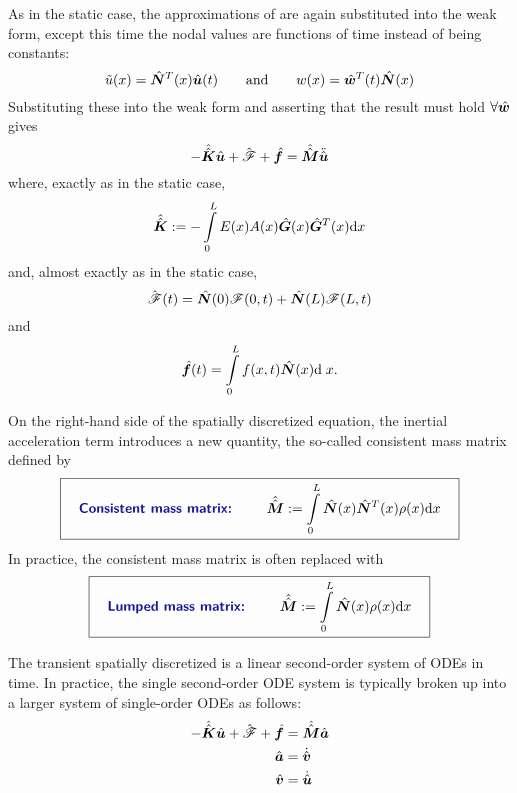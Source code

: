 As in the static case, the approximations of  are again substituted into the weak form, except this time the nodal values are functions of time instead of being constants:
\begin{equation}
  \tilde{u}(x)=
\hat{\bm{N}}^T(x) \hat{\bm{u}}(t)
\qquad\text{and}\qquad
  w(x)=\hat{\bm{w}}^T(t) \hat{\bm{N}}(x)
\label{eq:uandwtransient}
\end{equation}
Substituting these into the weak form and asserting that the result must hold $\forall \hat{\bm{w}}$ gives
\begin{equation}
-\hat{\hat{\bm{K}}}\hat{\bm{u}}+\hat{\bm{\mathscr{F}}}  +  \hat{\bm{f}}=\hat{\hat{\bm{M}}}\ddot{\hat{\bm{u}}}
\label{eq:TransientLinearBarWeakFormDiscr}
\end{equation}
%
%
where, exactly as in the static case,
\begin{equation}
  \hat{\hat{\bm{K}}} :=-\int\limits_0^L E(x)A(x) \hat{\bm{G}}(x)\hat{\bm{G}}^T(x)\mathrm{d} x
\end{equation}
and, almost exactly as in the static case,
\begin{equation}
  \hat{\bm{\mathscr{F}}}(t)=
\hat{\bm{N}}(0)\mathscr{F}(0,t)+\hat{\bm{N}}(L)\mathscr{F}(L,t)
\end{equation}
and
\begin{equation}
\hat{\bm{f}}(t)=
\int\limits_0^L f(x,{t})\hat{\bm{N}}(x)\mathrm{d} \;x.
\label{eq:TransientlinearBarBodyForceArray}
\end{equation}

On the right-hand side of the spatially discretized equation, the inertial acceleration term introduces a new quantity, the so-called consistent mass matrix defined by
\begin{equation}
\boxit{\quad
 \text{\Defn{Consistent mass matrix: }}\qquad \AArray{M}\definedEqual\int\limits_0^L \NBFa(x)\NBFa^T(x) \rho(x) \dd x
\quad}
\end{equation} 
In practice, the consistent mass matrix is often replaced with
\begin{equation}
\boxit{\quad
 \text{\Defn{Lumped mass matrix: }}\qquad \AArray{M}\definedEqual\int\limits_0^L \NBFa(x) \rho(x) \dd x
\quad}
\end{equation}


The transient spatially discretized  is a linear second-order system of ODEs in time. In practice, the single second-order ODE system is typically broken up into a larger system of single-order ODEs as follows:
\begin{subequations}
\begin{align}
-\hat{\hat{\bm{K}}}\hat{\bm{u}}+\hat{\bm{\mathscr{F}}}  +  \hat{\bm{f}}&=\hat{\hat{\bm{M}}}\hat{\bm{a}}
\label{eq:TransientLinearBarAcceleration}
\\
\hat{\bm{a}}&=\dot{\hat{\bm{v}}}
\\
\hat{\bm{v}}&=\dot{\hat{\bm{u}}}
\end{align}
\label{eq:TransientLinearBarWeakFormDiscrSplit}
\end{subequations}



